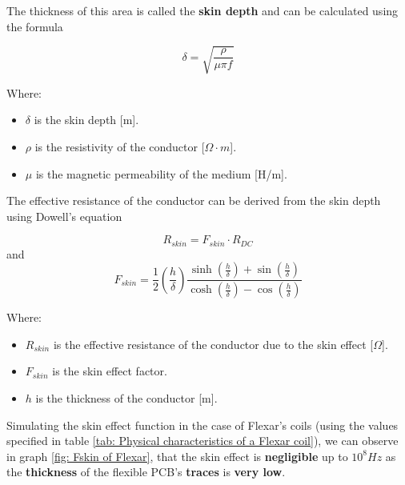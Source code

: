 \begin{itemize}
    \begin{samepage}
        The thickness of this area is called the \textbf{skin depth} and can be calculated using the formula
        \nopagebreak

        \begin{equation*}
            \delta = \sqrt{\frac{\rho}{\mu \pi f}}
        \end{equation*}
        \nopagebreak
                
        Where:
        \nopagebreak

        \begin{itemize}
            \item \( \delta \) is the skin depth [m].
            \item \( \rho \) is the resistivity of the conductor [\(\Omega \cdot m\)].
            \item \( \mu \) is the magnetic permeability of the medium [H/m].
        \end{itemize}
    \end{samepage}
    
    
    \begin{samepage}
        The effective resistance of the conductor can be derived from the skin depth using Dowell's equation \cite{AC_res_coils}
        \nopagebreak

        \begin{equation*}
            R_{skin} = F_{skin} \cdot R_{DC}
        \end{equation*}
        and
        \begin{equation*}
            F_{skin} = \frac{1}{2} (\frac{h}{\delta}) \frac{\sinh(\frac{h}{\delta}) + \sin(\frac{h}{\delta})}{\cosh(\frac{h}{\delta}) - \cos(\frac{h}{\delta})}
        \end{equation*}

        Where:
        \begin{itemize}
            \item \( R_{skin} \) is the effective resistance of the conductor due to the skin effect [\(\Omega\)].
            \item \( F_{skin} \) is the skin effect factor.
            \item \( h \) is the thickness of the conductor [m].
        \end{itemize}
    \end{samepage}

    \begin{samepage}
        Simulating the skin effect function in the case of Flexar's coils (using the values specified in table \ref{tab: Physical characteristics of a Flexar coil}), we can observe in graph \ref{fig: Fskin of Flexar}, that the skin effect is \textbf{negligible} up to $10^{8} Hz$ as the \textbf{thickness} of the flexible PCB's \textbf{traces} is \textbf{very low}.
        \nopagebreak


\end{samepage}
\end{itemize}
